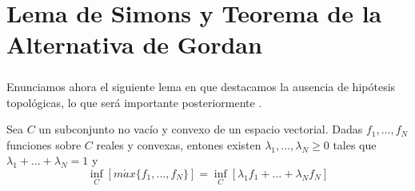 \chapter*{Lema de Simons y Teorema de la Alternativa de Gordan}
	\thispagestyle{empty}

	\paragraph{} Enunciamos ahora el siguiente lema en que destacamos la ausencia de hipótesis topológicas, lo que será importante posteriormente \cite{Simons2008}.
	
	\begin{lemaBox}
		Sea $ C $ un subconjunto no vacío y convexo de un espacio vectorial. Dadas $ f_1, ..., f_N $  funciones sobre $ C $ reales y convexas, entones existen $ \lambda_1, ..., \lambda_N \geq 0$ tales que $ \lambda_1+ ...+ \lambda_N = 1$ y
		\[
		\inf_C\left[ m\acute{a}x \{f_1, ..., f_N\}\right] = \inf_C \left[ \lambda_1 f_1+ ...+\lambda_N f_N \right]
		\] 
	\end{lemaBox}
